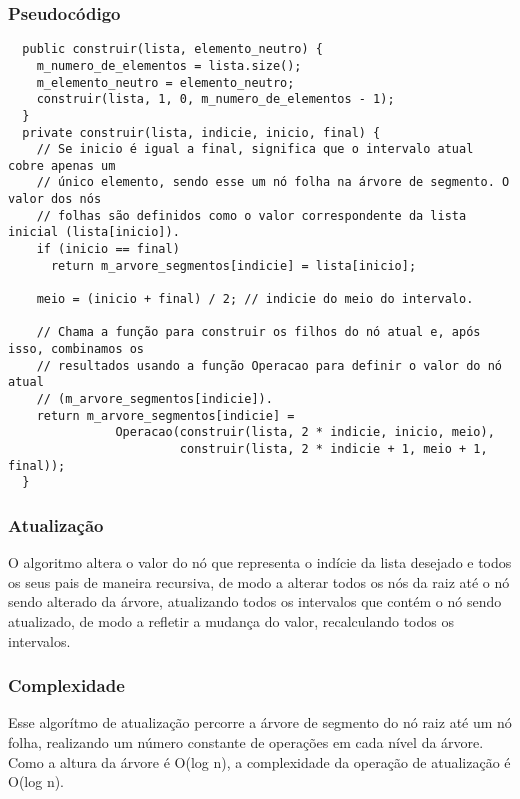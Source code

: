 \documentclass{article}
\begin{document}
\subsubsection{Pseudocódigo}
\begin{verbatim}
  public construir(lista, elemento_neutro) {
    m_numero_de_elementos = lista.size();
    m_elemento_neutro = elemento_neutro;
    construir(lista, 1, 0, m_numero_de_elementos - 1);
  }
  private construir(lista, indicie, inicio, final) {
    // Se inicio é igual a final, significa que o intervalo atual cobre apenas um
    // único elemento, sendo esse um nó folha na árvore de segmento. O valor dos nós
    // folhas são definidos como o valor correspondente da lista inicial (lista[inicio]).
    if (inicio == final) 
      return m_arvore_segmentos[indicie] = lista[inicio];

    meio = (inicio + final) / 2; // indicie do meio do intervalo.

    // Chama a função para construir os filhos do nó atual e, após isso, combinamos os
    // resultados usando a função Operacao para definir o valor do nó atual 
    // (m_arvore_segmentos[indicie]).
    return m_arvore_segmentos[indicie] =
               Operacao(construir(lista, 2 * indicie, inicio, meio),
                        construir(lista, 2 * indicie + 1, meio + 1, final));
  }
\end{verbatim}

\subsubsection{Atualização}
O algoritmo altera o valor do nó que representa o indície da lista desejado e todos os seus pais de 
maneira recursiva, de modo a alterar todos os nós da raiz até o nó sendo alterado da árvore, atualizando
todos os intervalos que contém o nó sendo atualizado, de modo a refletir a mudança do valor, recalculando
todos os intervalos.
\subsubsection{Complexidade}
Esse algorítmo de atualização percorre a árvore de segmento do nó raiz até um nó folha, realizando
um número constante de operações em cada nível da árvore. Como a altura da árvore é O(log n), a
complexidade da operação de atualização é O(log n).
\end{document}
